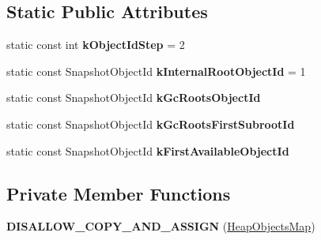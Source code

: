\subsection*{Static Public Attributes}
\begin{DoxyCompactItemize}
\item 
static const int {\bfseries k\+Object\+Id\+Step} = 2\hypertarget{classv8_1_1internal_1_1_heap_objects_map_a11bef81d3f530538f97fc8dd362d2e2d}{}\label{classv8_1_1internal_1_1_heap_objects_map_a11bef81d3f530538f97fc8dd362d2e2d}

\item 
static const Snapshot\+Object\+Id {\bfseries k\+Internal\+Root\+Object\+Id} = 1\hypertarget{classv8_1_1internal_1_1_heap_objects_map_a04fba906564af1ded2c829fe22b0f6d0}{}\label{classv8_1_1internal_1_1_heap_objects_map_a04fba906564af1ded2c829fe22b0f6d0}

\item 
static const Snapshot\+Object\+Id {\bfseries k\+Gc\+Roots\+Object\+Id}
\item 
static const Snapshot\+Object\+Id {\bfseries k\+Gc\+Roots\+First\+Subroot\+Id}
\item 
static const Snapshot\+Object\+Id {\bfseries k\+First\+Available\+Object\+Id}
\end{DoxyCompactItemize}
\subsection*{Private Member Functions}
\begin{DoxyCompactItemize}
\item 
{\bfseries D\+I\+S\+A\+L\+L\+O\+W\+\_\+\+C\+O\+P\+Y\+\_\+\+A\+N\+D\+\_\+\+A\+S\+S\+I\+GN} (\hyperlink{classv8_1_1internal_1_1_heap_objects_map}{Heap\+Objects\+Map})\hypertarget{classv8_1_1internal_1_1_heap_objects_map_abb8ad32a2b29080a6baabee294fcd0e6}{}\label{classv8_1_1internal_1_1_heap_objects_map_abb8ad32a2b29080a6baabee294fcd0e6}

\end{DoxyCompactItemize}
